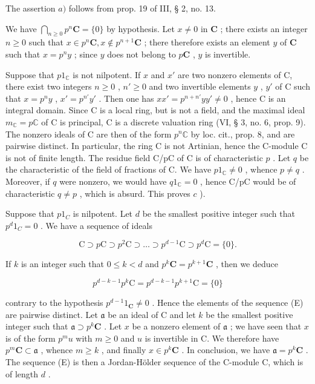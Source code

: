 The assertion \(a)\) follows from prop. 19 of III, § 2, no. 13.

We have \(\bigcap_{n\geqslant 0}p^{n}\mathbf{C} = \{0\}\) by hypothesis. Let \(x\neq 0\) in \(\mathbf{C}\) ; there exists an integer \(n\geqslant 0\) such that \(x\in p^n\mathbf{C}, x\notin p^{n + 1}\mathbf{C}\) ; there therefore exists an element \(y\) of \(\mathbf{C}\) such that \(x = p^n y\) ; since \(y\) does not belong to \(p\mathbf{C}\) , \(y\) is invertible.

Suppose that \(p1_{\mathbb{C}}\) is not nilpotent. If \(x\) and \(x'\) are two nonzero elements of C, there exist two integers \(n \geqslant 0\) , \(n' \geqslant 0\) and two invertible elements \(y\) , \(y'\) of C such that \(x = p^n y\) , \(x' = p^{n'} y'\) . Then one has \(xx' = p^{n+n'} yy' \neq 0\) , hence C is an integral domain. Since C is a local ring, but is not a field, and the maximal ideal \(m_{\mathbb{C}} = p\mathbb{C}\) of C is principal, C is a discrete valuation ring (VI, § 3, no. 6, prop. 9). The nonzero ideals of C are then of the form \(p^n\mathbb{C}\) by loc. cit., prop. 8, and are pairwise distinct. In particular, the ring C is not Artinian, hence the C-module C is not of finite length. The residue field C/pC of C is of characteristic \(p\) . Let \(q\) be the characteristic of the field of fractions of C. We have \(p1_{\mathbb{C}} \neq 0\) , whence \(p \neq q\) . Moreover, if \(q\) were nonzero, we would have \(q1_{\mathbb{C}} = 0\) , hence C/pC would be of characteristic \(q \neq p\) , which is absurd. This proves \(c\) ).

Suppose that \(p1_{C}\) is nilpotent. Let \(d\) be the smallest positive integer such that \(p^{d}1_{C} = 0\) . We have a sequence of ideals

\[
\mathrm{C} \supset p \mathrm{C} \supset p ^ {2} \mathrm{C} \supset \dots \supset p ^ {d - 1} \mathrm{C} \supset p ^ {d} \mathrm{C} = \{0 \}.\tag{E}
\]

If \(k\) is an integer such that \(0 \leqslant k < d\) and \(p^k\mathbf{C} = p^{k+1}\mathbf{C}\) , then we deduce

\[
p ^ {d - k - 1} p ^ {k} \mathrm{C} = p ^ {d - k - 1} p ^ {k + 1} \mathrm{C} = \{0 \}
\]

contrary to the hypothesis \(p^{d-1}1_{\mathbf{C}} \neq 0\) . Hence the elements of the sequence (E) are pairwise distinct. Let \(\mathfrak{a}\) be an ideal of C and let \(k\) be the smallest positive integer such that \(\mathfrak{a} \supset p^k\mathbf{C}\) . Let \(x\) be a nonzero element of \(\mathfrak{a}\) ; we have seen that \(x\) is of the form \(p^m u\) with \(m \geqslant 0\) and \(u\) is invertible in C. We therefore have \(p^m\mathbf{C} \subset \mathfrak{a}\) , whence \(m \geqslant k\) , and finally \(x \in p^k\mathbf{C}\) . In conclusion, we have \(\mathfrak{a} = p^k\mathbf{C}\) . The sequence (E) is then a Jordan-Hölder sequence of the C-module C, which is of length \(d\) .

